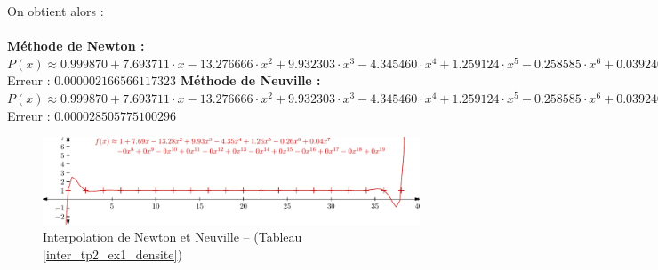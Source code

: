 \documentclass{report}
\begin{document}
	On obtient alors :\\ \\
	\textbf{Méthode de Newton :}\\
	$P(x) \approx 0.999870 + 7.693711 \cdot x - 13.276666 \cdot x^{2}  + 9.932303 \cdot x^{3} - 4.345460 \cdot x^{4}  + 1.259124 \cdot x^{5} - 0.258585 \cdot x^{6}  + 0.039240 \cdot x^{7} - 0.004520 \cdot x^{8}  + 0.000402 \cdot x^{9} - 0.000028 \cdot x^{10}  + 0.000002 \cdot x^{11} - 0.000000 \cdot x^{12}  + 0.000000 \cdot x^{13} - 0.000000 \cdot x^{14}  + 0.000000 \cdot x^{15} - 0.000000 \cdot x^{16}  + 0.000000 \cdot x^{17} - 0.000000 \cdot x^{18}  + 0.000000 \cdot x^{19} $\\
	Erreur : $0.000002166566117323$
	\newline
	\newline
	\textbf{Méthode de Neuville :}\\
	$P(x) \approx 0.999870 + 7.693711 \cdot x- 13.276666 \cdot x^{2}  + 9.932303 \cdot x^{3} - 4.345460 \cdot x^{4}  + 1.259124 \cdot x^{5} - 0.258585 \cdot x^{6}  + 0.039240 \cdot x^{7} - 0.004520 \cdot x^{8}  + 0.000402 \cdot x^{9} - 0.000028 \cdot x^{10}  + 0.000002 \cdot x^{11} - 0.000000 \cdot x^{12}  + 0.000000 \cdot x^{13} - 0.000000 \cdot x^{14}  + 0.000000 \cdot x^{15} - 0.000000 \cdot x^{16}  + 0.000000 \cdot x^{17} - 0.000000 \cdot x^{18}  + 0.000000 \cdot x^{19} $\\
	Erreur : $0.000028505775100296$
	\newline
	\newline
		  
	\begin{figure}[h]
	  \centering
	  \includegraphics{graphiques/pdf_output/inter_tp2_ex1.pdf}
	  \caption{Interpolation de Newton et Neuville -- (Tableau \ref{inter_tp2_ex1_densite})}
	\end{figure}
      \newpage
    
\end{document}
